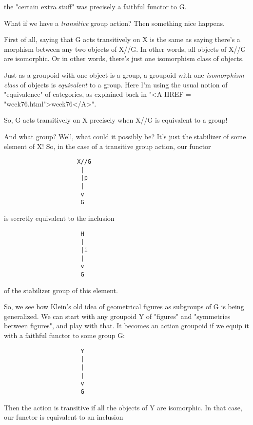 the "certain extra stuff" was precisely a faithful functor to G.  

What if we have a \emph{transitive} group action?  Then something nice
happens.

First of all, saying that G acts transitively on X is the same as
saying there's a morphism between any two objects of X//G.   In 
other words, all objects of X//G are isomorphic.  Or in other words, 
there's just one isomorphism class of objects.  

Just as a groupoid with one object is a group, a groupoid with one 
\emph{isomorphism class} of objects is \emph{equivalent} to a group.  Here 
I'm using the usual notion of "equivalence" of categories, as 
explained back in "<A HREF = "week76.html">week76</A>".

So, G acts transitively on X precisely when X//G is equivalent 
to a group!

And what group?  Well, what could it possibly be?  It's just the 
stabilizer of some element of X!  So, in the case of a transitive 
group action, our functor

\begin{verbatim}
                     X//G 
                      |
                      |p
                      |
                      v
                      G
\end{verbatim}
    
is secretly equivalent to the inclusion

\begin{verbatim}
                      H
                      |
                      |i
                      |
                      v
                      G
\end{verbatim}
    
of the stabilizer group of this element.

So, we see how Klein's old idea of geometrical figures as
subgroups of G is being generalized.  We can start with any groupoid Y
of "figures" and "symmetries between figures", and
play with that.  It becomes an action groupoid if we equip it with a
faithful functor to some group G:

\begin{verbatim}
                      Y
                      |
                      |
                      |
                      v
                      G
\end{verbatim}
    
Then the action is transitive if all the objects of Y are isomorphic.  
In that case, our functor is equivalent to an inclusion

